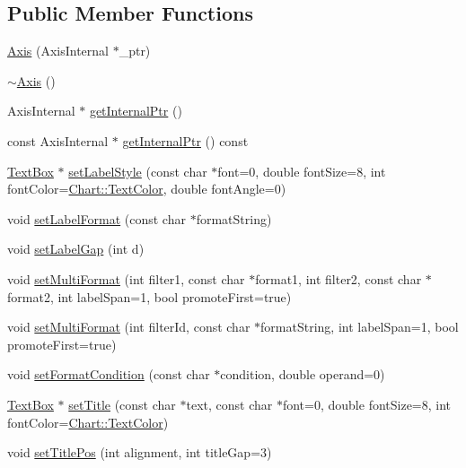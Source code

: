 \subsection*{Public Member Functions}
\begin{DoxyCompactItemize}
\item 
\hyperlink{class_axis_abc375bb09916fa2c60579810e1a3c53f}{Axis} (Axis\+Internal $\ast$\+\_\+ptr)
\item 
\hyperlink{class_axis_a675ffe75a5e61a9e4f60bb79749d5e0c}{$\sim$\+Axis} ()
\item 
Axis\+Internal $\ast$ \hyperlink{class_axis_af5704ff02fb2e04aa16f4a4ecefc072b}{get\+Internal\+Ptr} ()
\item 
const Axis\+Internal $\ast$ \hyperlink{class_axis_a376d55c978b25b17319af851a2f53f06}{get\+Internal\+Ptr} () const
\item 
\hyperlink{class_text_box}{Text\+Box} $\ast$ \hyperlink{class_axis_ab524e166c981420e6de22979fd695bb6}{set\+Label\+Style} (const char $\ast$font=0, double font\+Size=8, int font\+Color=\hyperlink{namespace_chart_abee0d882fdc9ad0b001245ad9fc64011a879e14f2f5024caccc047374342321ef}{Chart\+::\+Text\+Color}, double font\+Angle=0)
\item 
void \hyperlink{class_axis_a99c109ddb7e61206f7a8f1883d3e7a85}{set\+Label\+Format} (const char $\ast$format\+String)
\item 
void \hyperlink{class_axis_ae4b909cc52ff784757e92917a18ad917}{set\+Label\+Gap} (int d)
\item 
void \hyperlink{class_axis_a3a6ee98f7c5716c8cb94f325aa8a05d6}{set\+Multi\+Format} (int filter1, const char $\ast$format1, int filter2, const char $\ast$format2, int label\+Span=1, bool promote\+First=true)
\item 
void \hyperlink{class_axis_aa4b46e028226064bcc5f720ba04a9e08}{set\+Multi\+Format} (int filter\+Id, const char $\ast$format\+String, int label\+Span=1, bool promote\+First=true)
\item 
void \hyperlink{class_axis_aa73c26b4400fa61689f924fcea85c97e}{set\+Format\+Condition} (const char $\ast$condition, double operand=0)
\item 
\hyperlink{class_text_box}{Text\+Box} $\ast$ \hyperlink{class_axis_ac18e569a6c1b55500ed72c31dd516db7}{set\+Title} (const char $\ast$text, const char $\ast$font=0, double font\+Size=8, int font\+Color=\hyperlink{namespace_chart_abee0d882fdc9ad0b001245ad9fc64011a879e14f2f5024caccc047374342321ef}{Chart\+::\+Text\+Color})
\item 
void \hyperlink{class_axis_a77d098820ddd2387bab8db649a6d3fc3}{set\+Title\+Pos} (int alignment, int title\+Gap=3)

\end{DoxyCompactItemize}
